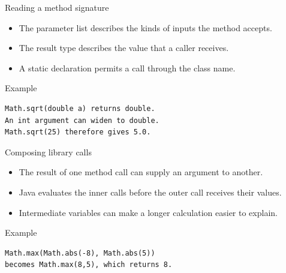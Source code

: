 \documentclass[10pt,aspectratio=169]{beamer}
\begin{document}
\begin{frame}[fragile,t]{Reading a method signature}
\begin{itemize}
\item The parameter list describes the kinds of inputs the method accepts.
\item The result type describes the value that a caller receives.
\item A static declaration permits a call through the class name.
\end{itemize}
\vspace{1mm}\begin{block}{Example}
\begin{lstlisting}
Math.sqrt(double a) returns double.
An int argument can widen to double.
Math.sqrt(25) therefore gives 5.0.
\end{lstlisting}
\end{block}
\end{frame}

\begin{frame}[fragile,t]{Composing library calls}
\begin{itemize}
\item The result of one method call can supply an argument to another.
\item Java evaluates the inner calls before the outer call receives their values.
\item Intermediate variables can make a longer calculation easier to explain.
\end{itemize}
\vspace{1mm}\begin{block}{Example}
\begin{lstlisting}
Math.max(Math.abs(-8), Math.abs(5))
becomes Math.max(8,5), which returns 8.
\end{lstlisting}
\end{block}
\end{frame}
\end{document}
